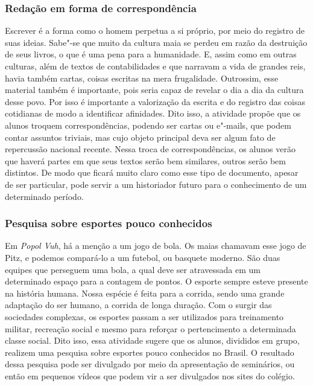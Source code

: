 \documentclass[11pt]{extarticle}
\begin{document}
\subsubsection{Redação em forma de correspondência}


  Escrever é a forma como o homem perpetua a si próprio, por meio do
  registro de suas ideias. Sabe"-se que muito da cultura maia se perdeu
  em razão da destruição de seus livros, o que é uma pena para a
  humanidade. E, assim como em outras culturas, além de textos de
  contabilidades e que narravam a vida de grandes reis, havia também
  cartas, coisas escritas na mera frugalidade. Outrossim, esse material
  também é importante, pois seria capaz de revelar o dia a dia da
  cultura desse povo. Por isso é importante a valorização da escrita e
  do registro das coisas cotidianas de modo a identificar afinidades. Dito isso, 
  a atividade propõe que os alunos troquem correspondências, podendo ser cartas ou e"-mails, que
  podem contar assuntos triviais, mas cujo objeto principal deva ser
  algum fato de repercussão nacional recente. Nessa troca de
  correspondências, os alunos verão que haverá partes em que seus textos
  serão bem similares, outros serão bem distintos. De modo que ficará
  muito claro como esse tipo de documento, apesar de ser particular,
  pode servir a um historiador futuro para o conhecimento de um
  determinado período.


\subsubsection{Pesquisa sobre esportes pouco conhecidos}


  Em \emph{Popol Vuh}, há a menção a um jogo de bola. Os maias chamavam
  esse jogo de Pitz, e podemos compará-lo a um futebol, ou basquete
  moderno. São duas equipes que perseguem uma bola, a qual deve ser
  atravessada em um determinado espaço para a contagem de pontos. O
  esporte sempre esteve presente na história humana. Nossa espécie é
  feita para a corrida, sendo uma grande adaptação do ser humano, a
  corrida de longa duração. Com o surgir das sociedades complexas, os
  esportes passam a ser utilizados para treinamento militar, recreação
  social e mesmo para reforçar o pertencimento a determinada classe
  social. Dito isso, essa atividade sugere que os alunos, divididos em
  grupo, realizem uma pesquisa sobre esportes pouco conhecidos no
  Brasil. O resultado dessa pesquisa pode ser divulgado por meio da
  apresentação de seminários, ou então em pequenos vídeos que podem vir
  a ser divulgados nos sites do colégio.
\end{document}
